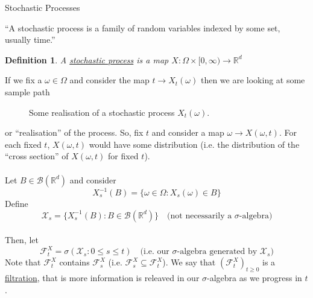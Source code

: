 \documentclass[12pt]{article}
\newtheorem{definition}{Definition}
\newcommand{\Emmett}[5]{%
\draw[#4] (0,0)
\foreach \x in {1,...,#1}
{   -- ++(#2,rand*#3+0.001)
}
node[right] {#5};
}
\begin{document}
\begin{section}{Stochastic Processes}

\noindent ``A stochastic process is a family of random variables indexed by some set, usually time.''

\begin{definition} A \underline{stochastic process} is a map $X:\Omega\times[0,\infty) \rightarrow \mathbb R^d$
\end{definition}

\noindent If we fix a $\omega \in \Omega$ and consider the map $t \rightarrow X_t(\omega)$ then we are looking at some sample path \\

\begin{figure}[h!]
\centering
{}
\caption{Some realisation of a stochastic process $X_t{(\omega)}$.}
\end{figure}

\noindent or ``realisation'' of the process. So, fix $t$ and consider a map $\omega \rightarrow X(\omega,t)$. For each fixed $t$, $X(\omega,t)$ would have some distribution (i.e. the distribution of the ``cross section'' of $X(\omega,t)$ for fixed $t$). \\
\\
\noindent Let $B \in \mathcal B(\mathbb R^d)$ and consider 
\begin{equation*}
X^{-1}_s(B) = \{\omega \in \Omega : X_s(\omega) \in B\}
\end{equation*}
Define 
\begin{equation*} 
\mathcal X_s = \{X^{-1}_s(B) : B \in \mathcal B(\mathbb R^d)\} \quad \text{(not necessarily a $\sigma$-algebra)}
\end{equation*}
\\
Then, let 
\begin{equation*} 
\mathcal F^X_t = \sigma(\mathcal X_s: 0 \leq s \leq t) \quad \text{(i.e. our $\sigma$-algebra generated by $\mathcal X_s$)}
\end{equation*}
\noindent Note that $\mathcal F^X_t$ contains $\mathcal F^X_s$ (i.e. $\mathcal F^X_s \subseteq \mathcal F^X_t$). We say that $(\mathcal F^X_t)_{t\geq0}$ is a \underline{filtration}, that is more information is releaved in our $\sigma$-algebra as we progress in $t$.


\end{section}
\end{document}
